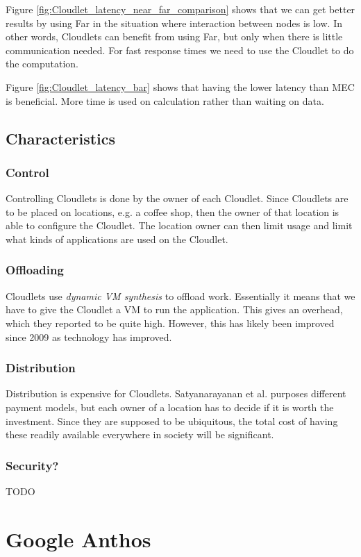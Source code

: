 Figure \ref{fig:Cloudlet_latency_near_far_comparison} shows that we can get better results by using Far in the situation where interaction between nodes is low. In other words, Cloudlets can benefit from using Far, but only when there is little communication needed. For fast response times we need to use the Cloudlet to do the computation. 

Figure \ref{fig:Cloudlet_latency_bar} shows that having the lower latency than MEC is beneficial. More time is used on calculation rather than waiting on data.



\subsection{Characteristics}
\subsubsection{Control}
Controlling Cloudlets is done by the owner of each Cloudlet. Since Cloudlets are to be placed on locations, e.g. a coffee shop, then the owner of that location is able to configure the Cloudlet. The location owner can then limit usage and limit what kinds of applications are used on the Cloudlet.
\subsubsection{Offloading}
Cloudlets use \textit{dynamic VM synthesis} \cite{satyanarayanan_case_2009} to offload work. Essentially it means that we have to give the Cloudlet a VM to run the application. This gives an overhead, which they reported to be quite high. However, this has likely been improved since 2009 as technology has improved. 
\subsubsection{Distribution}
Distribution is expensive for Cloudlets. Satyanarayanan et al.\cite{satyanarayanan_case_2009} purposes different payment models, but each owner of a location has to decide if it is worth the investment. Since they are supposed to be ubiquitous, the total cost of having these readily available everywhere in society will be significant. 
\subsubsection{Security?}
TODO

\section{Google Anthos}

